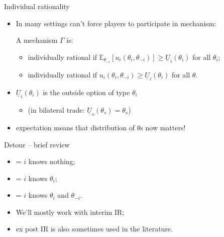 \documentclass[english,10pt
,aspectratio=169
]{beamer}
\begin{document}
\begin{frame}{Individual rationality}
\begin{itemize}
	\item In many settings can't force players to participate in mechanism:
	\begin{definition}[IR]
		A mechanism $\Gamma$ is:
		\begin{itemize}
			\item {} \alert{individually rational} if
			$\mathbb{E}_{\theta_{-i}} \left[u_i(\theta_i,\theta_{-i})\right] \geq \underline{U}_i(\theta_i)$ for all $\theta_i$;
			\item {} \alert{individually rational} if
			$u_i(\theta_i,\theta_{-i}) \geq \underline{U}_i(\theta_i)$ for all $\theta$.
		\end{itemize}
		
		
	\end{definition}
	\item $\underline{U}_i(\theta_i)$ is the outside option of type $\theta_i$
	\begin{itemize}
		\item (in bilateral trade: $\underline{U}_s(\theta_s) = \theta_s$)
	\end{itemize}
	\item expectation means that distribution of $\theta$s now matters!
\end{itemize}
\end{frame}


\begin{frame}{Detour -- brief review}
\begin{itemize}
	\item {} = $i$ knows nothing;
	\item {} = $i$ knows $\theta_i$;
	\item {} = $i$ knows $\theta_i$ and $\theta_{-i}$.
	\item We'll mostly work with interim IR; 
	\item ex post IR is also sometimes used in the literature.
\end{itemize}
\end{frame}
\end{document}
